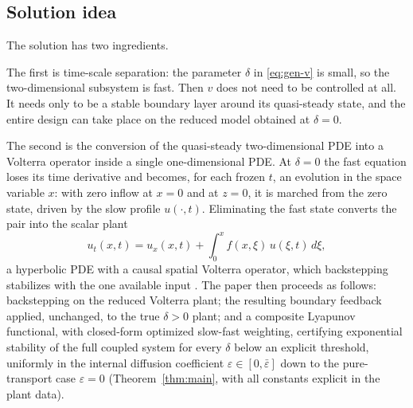 \documentclass[12pt]{article}
\theoremstyle{plain}
\theoremstyle{remark}
\begin{document}
\subsection{Solution idea}
The solution has two ingredients.

The first is time-scale separation: the parameter $\delta$ in \eqref{eq:gen-v} is small, so the two-dimensional subsystem is fast. Then $v$ does not need to be controlled at all. It needs only to be a stable boundary layer around its quasi-steady state, and the entire design can take place on the reduced model obtained at $\delta=0$.

The second is the conversion of the quasi-steady two-dimensional PDE into a Volterra operator inside a single one-dimensional PDE. At $\delta=0$ the fast equation loses its time derivative and becomes, for each frozen $t$, an evolution in the space variable $x$: with zero inflow at $x=0$ and at $z=0$, it is marched from the zero state, driven by the slow profile $u(\cdot,t)$. Eliminating the fast state converts the pair into the scalar plant
\begin{equation}
 u_t(x,t)=u_x(x,t)+\int_0^x f(x,\xi)\,u(\xi,t)\,d\xi ,
 \label{eq:introreduced}
\end{equation}
a hyperbolic PDE with a causal spatial Volterra operator, which backstepping stabilizes with the one available input \cite{KrsticSmyshlyaev2008}. The paper then proceeds as follows: backstepping on the reduced Volterra plant; the resulting boundary feedback applied, unchanged, to the true $\delta>0$ plant; and a composite Lyapunov functional, with closed-form optimized slow-fast weighting, certifying exponential stability of the full coupled system for every $\delta$ below an explicit threshold, uniformly in the internal diffusion coefficient $\varepsilon\in[0,\bar\varepsilon]$ down to the pure-transport case $\varepsilon=0$ (Theorem~\ref{thm:main}, with all constants explicit in the plant data).
\end{document}

